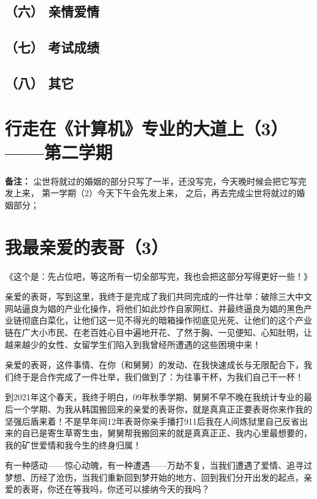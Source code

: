 \documentclass[9pt, b5paper]{article}
\begin{document}
\subsection{（六） 亲情爱情}
\label{sec:org1b6da55}
\subsection{（七） 考试成绩}
\label{sec:org44e2191}
\subsection{（八） 其它}
\label{sec:orge907316}

\section{行走在《计算机》专业的大道上（3）——第二学期}
\label{sec:org84ac11c}
  \textbf{备注：}
  尘世将就过的婚姻的部分只写了一半，还没写完，今天晚时候会把它写完发上来，
第一学期（2）今天下午会先发上来，
之后，再去完成尘世将就过的婚姻部分；

\section{我最亲爱的表哥（3）}
\label{sec:org2bdc317}

《这个是：先占位吧，等这所有一切全部写完，我也会把这部分写得更好一些！》

亲爱的表哥，写到这里，我终于是完成了我们共同完成的一件壮举：破除三大中文网站逼良为娼的产业化操作，将他们如此炒作自家网红、并最终逼良为娼的黑色产业链彻底白菜化，让他们这一见不得光的暗箱操作彻底见光死、让他们的这个产业链在广大小市民、在老百姓心目中遍地开花、了然于胸、一见便知、心知肚明，让越来越少的女性、女留学生们陷入到我曾经所遭遇的这些困境中来！

亲爱的表哥，这件事情、在你（和舅舅）的发动、在我快速成长与无限配合下，我们终于是合作完成了一件壮举，我们做到了：为往事干杯，为我们自己干一杯！

到2021年这个春天，我终于明白，09年秋季学期、舅舅不早不晚在我统计专业的最后一个学期、为我从韩国搬回来的亲爱的表哥你，就是真真正正要表哥你来作我的坚强后盾来着！不是早年间12年表哥你亲手播打911后我在人间炼狱里自己反省出来的自已是寄生草寄生虫，舅舅帮我搬回来的就是真真正正、我内心里最想要的，我的矿世爱情和我今生的终身归属！

有一种感动——惊心动魄，有一种遭遇——万劫不复，当我们遭遇了爱情、追寻过梦想、历经了沧伤，当我们重新回到梦开始的地方、回到我们分开出发的起点，亲爱的表哥，你还在等我吗，你还可以接纳今天的我吗？
\end{document}
